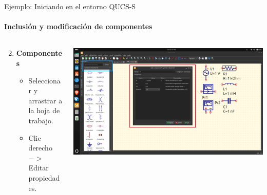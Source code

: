 \documentclass{beamer}
\begin{document}
\begin{frame}[fragile]{Ejemplo: Iniciando en el entorno QUCS-S}
  \framesubtitle{Inclusión y modificación de componentes}

  \begin{columns}[T]
    \begin{column}{0.5\textwidth}
      \begin{enumerate}
        \setcounter{enumi}{1} %
        \item \textbf{Componentes}
          \begin{itemize}
            \item Seleccionar y arrastrar a la hoja de trabajo.
            \item Clic derecho $->$ Editar propiedades.
          \end{itemize}
      \end{enumerate}
    \end{column}

    \begin{column}{0.5\textwidth}
      \includegraphics[width=\columnwidth]{Imagenes/Comps.png}
    \end{column}
  \end{columns}
\end{frame}
\end{document}
